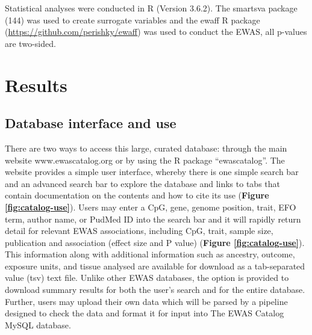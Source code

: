 \documentclass[11pt,oneside]{bristolthesis}
\begin{document}
Statistical analyses were conducted in R (Version 3.6.2). The smartsva package (144) was used to create surrogate variables and the ewaff R package (\url{https://github.com/perishky/ewaff}) was used to conduct the EWAS, all p-values are two-sided.

\hypertarget{results-03}{%
\section{Results}\label{results-03}}

\hypertarget{database-interface-and-use}{%
\subsection{Database interface and use}\label{database-interface-and-use}}

There are two ways to access this large, curated database: through the main website www.ewascatalog.org or by using the R package ``ewascatalog''. The website provides a simple user interface, whereby there is one simple search bar and an advanced search bar to explore the database and links to tabs that contain documentation on the contents and how to cite its use (\textbf{Figure \ref{fig:catalog-use}}). Users may enter a CpG, gene, genome position, trait, EFO term, author name, or PudMed ID into the search bar and it will rapidly return detail for relevant EWAS associations, including CpG, trait, sample size, publication and association (effect size and P value) (\textbf{Figure \ref{fig:catalog-use}}). This information along with additional information such as ancestry, outcome, exposure units, and tissue analysed are available for download as a tab-separated value (tsv) text file. Unlike other EWAS databases, the option is provided to download summary results for both the user's search and for the entire database. Further, users may upload their own data which will be parsed by a pipeline designed to check the data and format it for input into The EWAS Catalog MySQL database.
\end{document}
